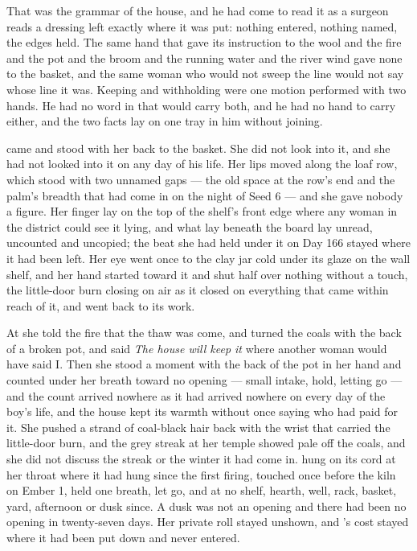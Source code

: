 That was the grammar of the house, and he had come to read it as a surgeon reads a dressing left exactly where it was put: nothing entered, nothing named, the edges held. The same hand that gave its instruction to the wool and the fire and the pot and the broom and the running water and the river wind gave none to the basket, and the same woman who would not sweep the line would not say whose line it was. Keeping and withholding were one motion performed with two hands. He had no word in  that would carry both, and he had no hand to carry either, and the two facts lay on one tray in him without joining.

 came and stood with her back to the basket. She did not look into it, and she had not looked into it on any day of his life. Her lips moved along the loaf row, which stood with two unnamed gaps --- the old space at the row's end and the palm's breadth that had come in on the night of Seed 6 --- and she gave nobody a figure. Her finger lay on the top of the shelf's front edge where any woman in the district could see it lying, and what lay beneath the board lay unread, uncounted and uncopied; the beat she had held under it on Day 166 stayed where it had been left. Her eye went once to the clay jar cold under its glaze on the wall shelf, and her hand started toward it and shut half over nothing without a touch, the little-door burn closing on air as it closed on everything that came within reach of it, and went back to its work.

At  she told the fire that the thaw was come, and turned the coals with the back of a broken pot, and said \emph{The house will keep it} where another woman would have said I. Then she stood a moment with the back of the pot in her hand and counted under her breath toward no opening --- small intake, hold, letting go --- and the count arrived nowhere as it had arrived nowhere on every day of the boy's life, and the house kept its warmth without once saying who had paid for it. She pushed a strand of coal-black hair back with the wrist that carried the little-door burn, and the grey streak at her temple showed pale off the coals, and she did not discuss the streak or the winter it had come in.  hung on its cord at her throat where it had hung since the first firing, touched once before the kiln on Ember 1, held one breath, let go, and at no shelf, hearth, well, rack, basket, yard, afternoon or dusk since. A dusk was not an opening and there had been no opening in twenty-seven days. Her private roll stayed unshown, and 's cost stayed where it had been put down and never entered.

